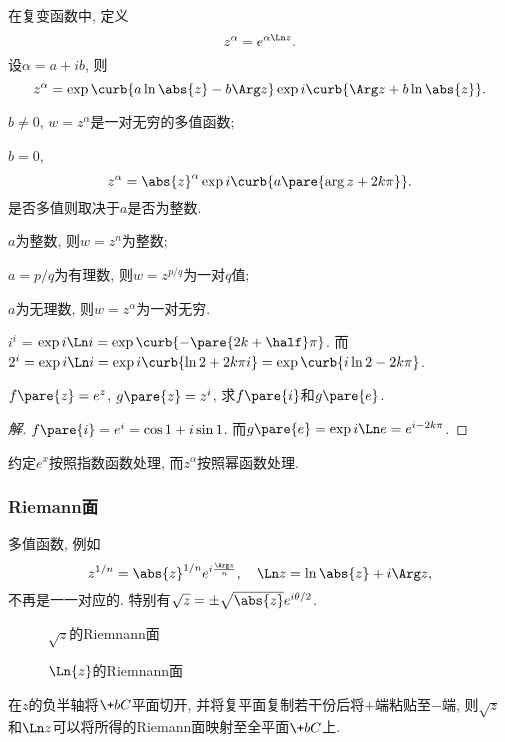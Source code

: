 \documentclass[../ComplexVariable.tex]{subfiles}
\begin{document}
在复变函数中, 定义
\[ z^\alpha = e^{\alpha \Ln z}. \]
设$\alpha = a+ib$, 则
\[ z^\alpha = \exp\curb{a\ln\abs{z} - b\Arg z} \exp i\curb{\Arg z + b\ln\abs{z}}. \]
\begin{cenum}
    \item $b\neq 0$, $w=z^\alpha$是一对无穷的多值函数;
    \item $b = 0$,
    \[ z^\alpha = \abs{z}^\alpha \exp i\curb{a\pare{\arg z + 2k\pi}}. \]
    是否多值则取决于$a$是否为整数.
    \begin{cenum}
        \item $a$为整数, 则$w=z^n$为整数;
        \item $a = p/q$为有理数, 则$w = z^{p/q}$为一对$q$值;
        \item $a$为无理数, 则$w=z^\alpha$为一对无穷.
    \end{cenum}
\end{cenum}
\begin{sample}
    \begin{ex}
        $i^i$ = $\exp i\Ln i = \exp \curb{-\pare{2k+\displaystyle\half}\pi}$. 而$2^i = \exp i\Ln i = \exp i\curb{\ln 2 + 2k\pi i} = \exp\curb{i\ln 2 - 2k\pi}$.
    \end{ex}
\end{sample}
\begin{sample}
    \begin{ex}
        $f\pare{z} = e^z$, $g\pare{z} = z^i$, 求$f\pare{i}$和$g\pare{e}$.
    \end{ex}
    \begin{proof}[解]
        $f\pare{i} = e^i = \cos 1 + i \sin 1$. 而$g\pare{e} = \exp i\Ln e = e^{i-2k\pi}$.
    \end{proof}
\end{sample}
\begin{remark}
    约定$e^x$按照指数函数处理, 而$z^\alpha$按照幂函数处理.
\end{remark}

\subsubsection{Riemann面} %
\label{ssub:riemann面}

多值函数, 例如
\[ z^{1/n} = \abs{z}^{1/n}e^{i\frac{\Arg z}{n}},\quad \Ln z = \ln \abs{z} + i\Arg z, \]
不再是一一对应的. 特别有$\sqrt{z} = \pm \sqrt{\abs{z}}e^{i\theta/2}$.
\begin{figure}[htbp]
    \centering
    \caption{$\sqrt{z}$的Riemnann面}
    \label{fig:sqrtz的Riemnann面}
\end{figure}
\begin{figure}[htbp]
    \centering
    \caption{$\Ln{z}$的Riemnann面}
    \label{fig:lnz的Riemnann面}
\end{figure}
在$z$的负半轴将$\+bC$平面切开, 并将复平面复制若干份后将$+$端粘贴至$-$端, 则$\sqrt{z}$和$\Ln z$可以将所得的Riemann面映射至全平面$\+bC$上.



\end{document}
